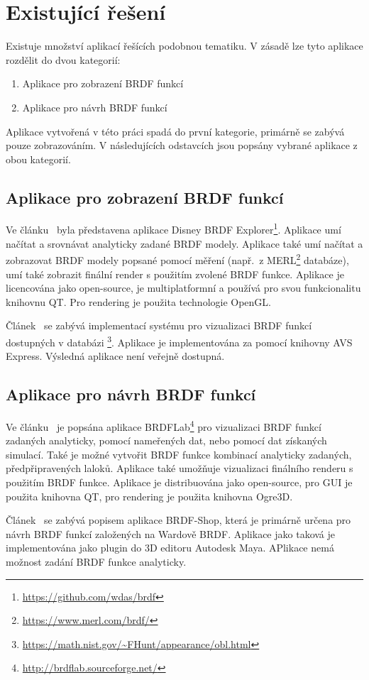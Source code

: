 \documentclass[czech,master]{diploma}
\begin{document}
\section{Existující řešení}
Existuje množství aplikací řešících podobnou tematiku. V zásadě lze tyto aplikace rozdělit do dvou kategorií:
\begin{enumerate}
  \item Aplikace pro zobrazení BRDF funkcí
  \item Aplikace pro návrh BRDF funkcí
\end{enumerate}
Aplikace vytvořená v této práci spadá do první kategorie, primárně se zabývá pouze zobrazováním. V následujících odstavcích jsou popsány vybrané aplikace z obou kategorií.

\subsection{Aplikace pro zobrazení BRDF funkcí}
Ve článku~\cite{DisneyBRDF} byla představena aplikace Disney BRDF Explorer\footnote{\url{https://github.com/wdas/brdf}}. Aplikace umí načítat a srovnávat analyticky zadané BRDF modely. Aplikace také umí načítat a zobrazovat BRDF modely popsané pomocí měření (např.\ z MERL\footnote{\url{https://www.merl.com/brdf/}} databáze), umí také zobrazit finální render s použitím zvolené BRDF funkce. Aplikace je licencována jako open-source, je multiplatformní a používá pro svou funkcionalitu knihovnu QT\@. Pro rendering je použita technologie OpenGL\@.\par
Článek~\cite{brdfviz} se zabývá implementací systému pro vizualizaci BRDF funkcí dostupných v databázi \footnote{\url{https://math.nist.gov/~FHunt/appearance/obl.html}}. Aplikace je implementována za pomocí knihovny AVS Express. Výsledná aplikace není veřejně dostupná.

\subsection{Aplikace pro návrh BRDF funkcí}
Ve článku~\cite{Fors2009BRDFLabAG} je popsána aplikace BRDFLab\footnote{\url{http://brdflab.sourceforge.net/}} pro vizualizaci BRDF funkcí zadaných analyticky, pomocí nameřených dat, nebo pomocí dat získaných simulací. Také je možné vytvořit BRDF funkce kombinací analyticky zadaných, předpřipravených laloků. Aplikace také umožňuje vizualizaci finálního renderu s použitím BRDF funkce. Aplikace je distribuována jako open-source, pro GUI je použita knihovna QT, pro rendering je použita knihovna Ogre3D.
\par
Článek~\cite{brdfshop} se zabývá popisem aplikace BRDF-Shop, která je primárně určena pro návrh BRDF funkcí založených na Wardově BRDF\@. Aplikace jako taková je implementována jako plugin do 3D editoru Autodesk Maya. APlikace nemá možnost zadání BRDF funkce analyticky.
\end{document}

